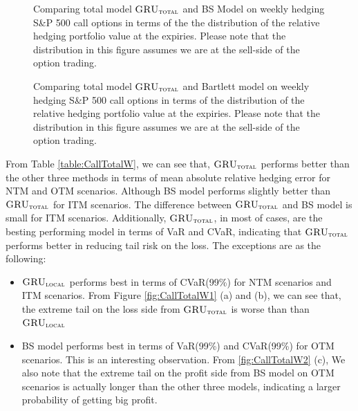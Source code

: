 \documentclass[letterpaper,12pt,titlepage,oneside,final]{book}
\numberwithin{equation}{section}
\theoremstyle{definition}
\newcommand{\modelT}{\textsc{GRU}_{\textsc{total}}}
\newcommand{\modelL}{\textsc{GRU}_{\textsc{local}}}
\begin{document}
\begin{figure}[htp!]
	\caption{Comparing total model $\modelT$ and BS Model  on weekly hedging S\&P 500 call options in terms of the the distribution of the  relative hedging portfolio value at the expiries. Please note that the distribution in this figure assumes we are at the sell-side of the option trading.} 
	\label{fig:CallTotalW2}
	\centering
	\caption{Comparing total model $\modelT$ and Bartlett model on weekly hedging S\&P 500 call options in terms of the distribution of the  relative hedging portfolio value at the expiries.  Please note that the distribution in this figure assumes we are at the sell-side of the option trading.} \label{fig:CallTotalW3}
\end{figure}

From Table \ref{table:CallTotalW}, we can see that, $\modelT$ performs better than the other three methods in terms of 
mean absolute relative hedging error for NTM and OTM scenarios. Although BS model performs slightly better than   $\modelT$ for ITM scenarios. The difference between  $\modelT$  and BS model is small for ITM scenarios. Additionally, $\modelT$, in most of cases, are the besting performing model in terms of VaR and CVaR, indicating that $\modelT$ performs better in reducing tail risk on the loss.  The exceptions are as the following:
\begin{itemize}
	\item $\modelL$ performs best in terms of  CVaR(99\%) for NTM scenarios and ITM scenarios. From Figure \ref{fig:CallTotalW1} (a) and (b), we can see that, the extreme tail on the loss side from  $\modelT$ is worse than than $\modelL$
	\item  BS model performs best in terms of  VaR(99\%) and  CVaR(99\%) for OTM scenarios. This is an interesting observation. From \ref{fig:CallTotalW2} (c), We also note that the extreme tail on the profit side from BS model on OTM scenarios is actually longer than the other three models, indicating a larger probability of getting big profit. 
\end{itemize}
\end{document}
